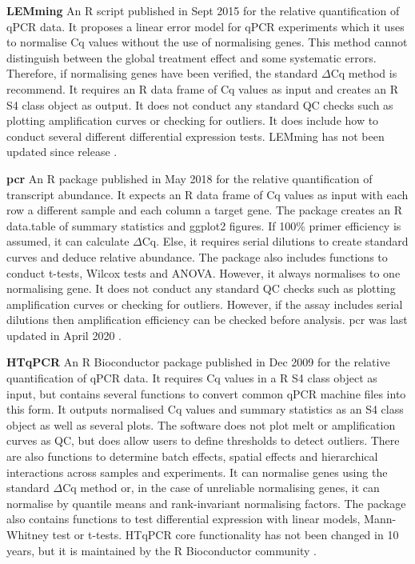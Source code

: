 \documentclass[../main.tex]{subfiles}
\begin{document}
\textbf{LEMming} An R script published in Sept 2015 for the relative quantification of qPCR data. 
It proposes a linear error model for qPCR experiments which it uses to normalise Cq values without the use of normalising genes. 
This method cannot distinguish between the global treatment effect and some systematic errors. 
Therefore, if normalising genes have been verified, the standard $\Delta$Cq method is recommend. 
It requires an R data frame of Cq values as input and creates an R S4 class object as output. 
It does not conduct any standard QC checks such as plotting amplification curves or checking for outliers.  
It does include how to conduct several different differential expression tests. LEMming has not been updated since release \parencite{Feuer2015}.

\textbf{pcr} An R package published in May 2018 for the relative quantification of transcript abundance. 
It expects an R data frame of Cq values as input with each row a different sample and each column a target gene. 
The package creates an R data.table of summary statistics and ggplot2 figures. 
If 100\% primer efficiency is assumed, it can calculate $\Delta$Cq. 
Else, it requires serial dilutions to create standard curves and deduce relative abundance. 
The package also includes functions to conduct t-tests, Wilcox tests  and ANOVA.
However, it always normalises to one normalising gene. It does not conduct any standard QC checks such as plotting amplification curves or checking for outliers. 
However, if the assay includes serial dilutions then amplification efficiency can be checked before analysis. 
pcr was last updated in April 2020 \parencite{Ahmed2018}.

\textbf{HTqPCR} An R Bioconductor package published in Dec 2009 for the relative quantification of qPCR data. 
It requires Cq values in a R S4 class object as input, but contains several functions to convert common qPCR machine files into this form. 
It outputs normalised Cq values and summary statistics as an S4 class object as well as several plots. 
The software does not plot melt or amplification curves as QC, but does allow users to define thresholds to detect outliers. 
There are also functions to determine batch effects, spatial effects and hierarchical interactions across samples and experiments. 
It can normalise genes using the standard $\Delta$Cq method or, in the case of unreliable normalising genes, it can normalise by quantile means and rank-invariant normalising factors. 
The package also contains functions to test differential expression with linear models, Mann-Whitney test or t-tests. 
HTqPCR core functionality has not been changed in 10 years, but it is maintained by the R Bioconductor community \parencite{Dvinge2009}.
\end{document}
